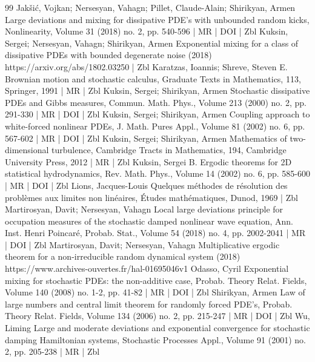 \begin{thebibliography}{99}
Jakšić, Vojkan; Nersesyan, Vahagn; Pillet, Claude-Alain; Shirikyan, Armen Large deviations and mixing for dissipative PDE’s with unbounded random kicks, Nonlinearity, Volume 31 (2018) no. 2, pp. 540-596 | MR | DOI | Zbl
Kuksin, Sergei; Nersesyan, Vahagn; Shirikyan, Armen Exponential mixing for a class of dissipative PDEs with bounded degenerate noise (2018) https://arxiv.org/abs/1802.03250 | Zbl
Karatzas, Ioannis; Shreve, Steven E. Brownian motion and stochastic calculus, Graduate Texts in Mathematics, 113, Springer, 1991 | MR | Zbl
Kuksin, Sergei; Shirikyan, Armen Stochastic dissipative PDEs and Gibbs measures, Commun. Math. Phys., Volume 213 (2000) no. 2, pp. 291-330 | MR | DOI | Zbl
Kuksin, Sergei; Shirikyan, Armen Coupling approach to white-forced nonlinear PDEs, J. Math. Pures Appl., Volume 81 (2002) no. 6, pp. 567-602 | MR | DOI | Zbl
Kuksin, Sergei; Shirikyan, Armen Mathematics of two-dimensional turbulence, Cambridge Tracts in Mathematics, 194, Cambridge University Press, 2012 | MR | Zbl
Kuksin, Sergei B. Ergodic theorems for 2D statistical hydrodynamics, Rev. Math. Phys., Volume 14 (2002) no. 6, pp. 585-600 | MR | DOI | Zbl
Lions, Jacques-Louis Quelques méthodes de résolution des problèmes aux limites non linéaires, Études mathématiques, Dunod, 1969 | Zbl
Martirosyan, Davit; Nersesyan, Vahagn Local large deviations principle for occupation measures of the stochastic damped nonlinear wave equation, Ann. Inst. Henri Poincaré, Probab. Stat., Volume 54 (2018) no. 4, pp. 2002-2041 | MR | DOI | Zbl
Martirosyan, Davit; Nersesyan, Vahagn Multiplicative ergodic theorem for a non-irreducible random dynamical system (2018) https://www.archives-ouvertes.fr/hal-01695046v1
Odasso, Cyril Exponential mixing for stochastic PDEs: the non-additive case, Probab. Theory Relat. Fields, Volume 140 (2008) no. 1-2, pp. 41-82 | MR | DOI | Zbl
Shirikyan, Armen Law of large numbers and central limit theorem for randomly forced PDE’s, Probab. Theory Relat. Fields, Volume 134 (2006) no. 2, pp. 215-247 | MR | DOI | Zbl
Wu, Liming Large and moderate deviations and exponential convergence for stochastic damping Hamiltonian systems, Stochastic Processes Appl., Volume 91 (2001) no. 2, pp. 205-238 | MR | Zbl
\end{thebibliography}
